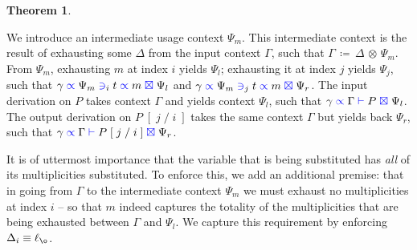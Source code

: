 \documentclass[a4paper,UKenglish,cleveref, autoref, thm-restate,authorcolumns]{lipics-v2019}
\theoremstyle{definition}
\newtheorem{nitheorem}[theorem]{Theorem}
\newcommand{\type}[1]{\textcolor{blue}{\operatorname{#1}}}
\newcommand{\subst}[3]{#1 \; [ \; #2 \; / \;#3 \;]}
\newcommand{\opctx}[3]{#1 \, \coloneqq \, #2 \, \otimes \, #3}
\newcommand{\types}[4]{#1 \; \type{\propto} \; #2 \; \type{\vdash} \; #3 \; \type{\boxtimes} \; #4}
\newcommand{\contains}[6]{#1 \; \type{\propto} \; #2 \; \type{\ni}_{#3} \; #4 \; \type{\propto} \; #5 \; \type{\boxtimes} \; #6}
\begin{document}
\begin{nitheorem}
  \label{thm:subst-generalization}

  We introduce an intermediate usage context $\Psi_m$.
  This intermediate context is the result of exhausting some $\Delta$ from the input context $\Gamma$, such that $\opctx{\Gamma}{\Delta}{\Psi_m}$.
  From $\Psi_m$, exhausting $m$ at index $i$ yields $\Psi_l$; exhausting it at index $j$ yields $\Psi_j$, such that $\contains{\gamma}{\Psi_m}{i}{t}{m}{\Psi_l}$ and $\contains{\gamma}{\Psi_m}{j}{t}{m}{\Psi_r}$.
  The input derivation on $P$ takes context $\Gamma$ and yields context $\Psi_l$, such that $\types{\gamma}{\Gamma}{P}{\Psi_l}$.
  The output derivation on $\subst{P}{j}{i}$ takes the same context $\Gamma$ but yields back $\Psi_r$, such that $\types{\gamma}{\Gamma}{\subst{P}{j}{i}}{\Psi_r}$.

  \begin{remark}
    \label{re:delta-zero}
    It is of uttermost importance that the variable that is being substituted has \emph{all} of its multiplicities substituted.
    To enforce this, we add an additional premise: that in going from $\Gamma$ to the intermediate context $\Psi_m$ we must exhaust no multiplicities at index $i$ -- so that $m$ indeed captures the totality of the multiplicities that are being exhausted between $\Gamma$ and $\Psi_l$.
    We capture this requirement by enforcing $\Delta_i \equiv \ell_{\o}$.
  \end{remark}
\end{nitheorem}
\end{document}
